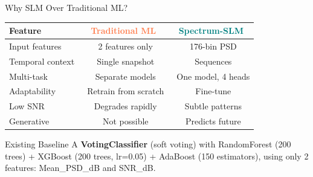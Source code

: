 \documentclass[aspectratio=169, 10pt]{beamer}
\newcommand{\cmark}{\textcolor{teal}{\ding{51}}}
\newcommand{\xmark}{\textcolor{coral}{\ding{55}}}
\begin{document}
\begin{frame}{Why SLM Over Traditional ML?}
\small
\begin{center}
\renewcommand{\arraystretch}{1.35}
\begin{tabular}{@{}p{3cm} c c@{}}
\toprule
\textbf{Feature} &
\textbf{\textcolor{coral}{Traditional ML}} &
\textbf{\textcolor{teal}{Spectrum-SLM}} \\
\midrule
\rowcolor{lightbg}
Input features     & \xmark\ 2 features only     & \cmark\ 176-bin PSD \\
Temporal context   & \xmark\ Single snapshot      & \cmark\ Sequences \\
\rowcolor{lightbg}
Multi-task         & \xmark\ Separate models      & \cmark\ One model, 4 heads \\
Adaptability       & \xmark\ Retrain from scratch & \cmark\ Fine-tune \\
\rowcolor{lightbg}
Low SNR            & \xmark\ Degrades rapidly     & \cmark\ Subtle patterns \\
Generative         & \xmark\ Not possible         & \cmark\ Predicts future \\
\bottomrule
\end{tabular}
\end{center}

\vspace{4pt}

\begin{exampleblock}{Existing Baseline}
\footnotesize
A \textbf{VotingClassifier} (soft voting) with RandomForest (200 trees) + XGBoost (200 trees, lr=0.05) + AdaBoost (150 estimators), using only 2 features: Mean\_PSD\_dB and SNR\_dB.
\end{exampleblock}
\end{frame}


\end{document}
